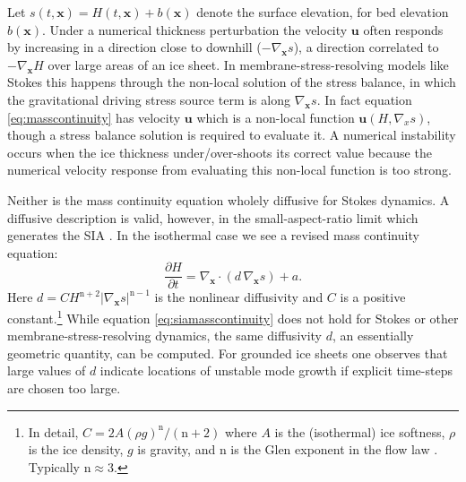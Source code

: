 \documentclass[twocolumn,letterpaper]{igs}
\newcommand\bu{\mathbf{u}}
\newcommand\bx{\mathbf{x}}
\newcommand{\grad}{\nabla}
\newcommand{\Divx}{\nabla_\bx \cdot}
\newcommand{\gradx}{\nabla_\bx}
\begin{document}
Let $s(t,\bx)=H(t,\bx)+b(\bx)$ denote the surface elevation, for bed elevation $b(\bx)$.  Under a numerical thickness perturbation the velocity $\bu$ often responds by increasing in a direction close to downhill ($-\gradx s$), a direction correlated to $-\gradx H$ over large areas of an ice sheet.  In membrane-stress-resolving models like Stokes this happens through the non-local solution of the stress balance, in which the gravitational driving stress source term is along $\gradx s$.  In fact equation \eqref{eq:masscontinuity} has velocity $\bu$ which is a non-local function $\bu(H,\grad_x s)$, though a stress balance solution is required to evaluate it.  A numerical instability occurs when the ice thickness under/over-shoots its correct value because the numerical velocity response from evaluating this non-local function is too strong.

\newcommand{\nn}{\text{n}}
Neither is the mass continuity equation wholely diffusive for Stokes dynamics.  A diffusive description is valid, however, in the small-aspect-ratio limit which generates the SIA \citep{SchoofHewitt2013}.  In the isothermal case we see a revised mass continuity equation:
\begin{equation}
\frac{\partial H}{\partial t} = \Divx \left(d\, \gradx s \right) + a. \label{eq:siamasscontinuity}
\end{equation}
Here $d = C H^{\nn+2} |\gradx s|^{\nn-1}$ is the nonlinear diffusivity and $C$ is a positive constant.\footnote{In detail, $C = 2 A (\rho g)^\nn/(\nn+2)$ where $A$ is the (isothermal) ice softness, $\rho$ is the ice density, $g$ is gravity, and $\nn$ is the Glen exponent in the flow law \citep{GreveBlatter2009}.  Typically $\nn\approx 3$.}  While equation \eqref{eq:siamasscontinuity} does not hold for Stokes or other membrane-stress-resolving dynamics, the same diffusivity $d$, an essentially geometric quantity, can be computed.  For grounded ice sheets one observes that large values of $d$ indicate locations of unstable mode growth if explicit time-steps are chosen too large.
\end{document}
